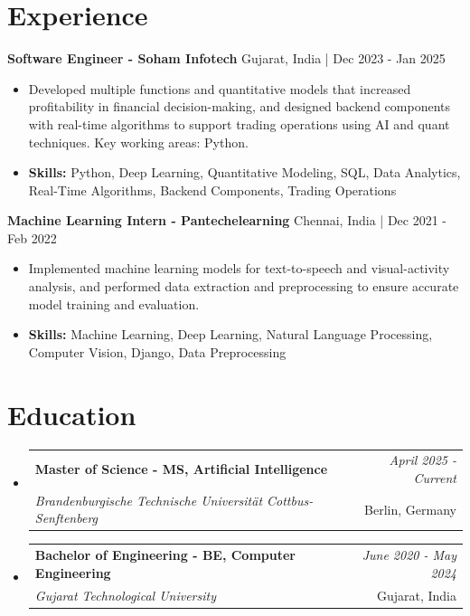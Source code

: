 \documentclass[a4paper,11pt]{article}
\makeatletter
\newcommand{\resumeSubheading}[4]{
\vspace{0.5mm}\item
    \begin{tabular*}{0.98\textwidth}[t]{l@{\extracolsep{\fill}}r}
        \textbf{#1} & \textit{\footnotesize{#4}} \\
        \textit{\footnotesize{#3}} &  \footnotesize{#2}\\
    \end{tabular*}
    \vspace{-2.4mm}
}
\makeatother
\begin{document}
\section{\textbf{Experience}}


\vspace{1mm}
  \textbf{Software Engineer - Soham Infotech} \hfill Gujarat, India | Dec 2023 - Jan 2025
\vspace{-1.5mm} %
\begin{itemize}
  \item Developed multiple functions and quantitative models that increased profitability in financial decision-making, and designed backend components with real-time algorithms to support trading operations using AI and quant techniques. Key working areas: Python.

\vspace{-2mm}
  \item \textbf{Skills:} Python, Deep Learning, Quantitative Modeling, SQL, Data Analytics, Real-Time Algorithms, Backend Components, Trading Operations
\end{itemize}

\vspace{1mm}
  \textbf{Machine Learning Intern - Pantechelearning} \hfill Chennai, India | Dec 2021 - Feb 2022
\vspace{-1.5mm} %
\begin{itemize}
  \item Implemented machine learning models for text-to-speech and visual-activity analysis, and performed data extraction and preprocessing to ensure accurate model training and evaluation.
\vspace{-2mm}
  \item \textbf{Skills:} Machine Learning, Deep Learning, Natural Language Processing, Computer Vision, Django, Data Preprocessing
\end{itemize}\section{\textbf{Education}}
\vspace{-0.4mm}

\begin{itemize}
\resumeSubheading
{Master of Science - MS, Artificial Intelligence }{Berlin, Germany}
{Brandenburgische Technische Universität Cottbus-Senftenberg  }{April 2025 - Current}

\vspace{1.0mm} %
\resumeSubheading
{Bachelor of Engineering - BE, Computer Engineering  }{Gujarat, India}
{Gujarat Technological University }{June 2020 - May 2024}

\end{itemize}
\end{document}
